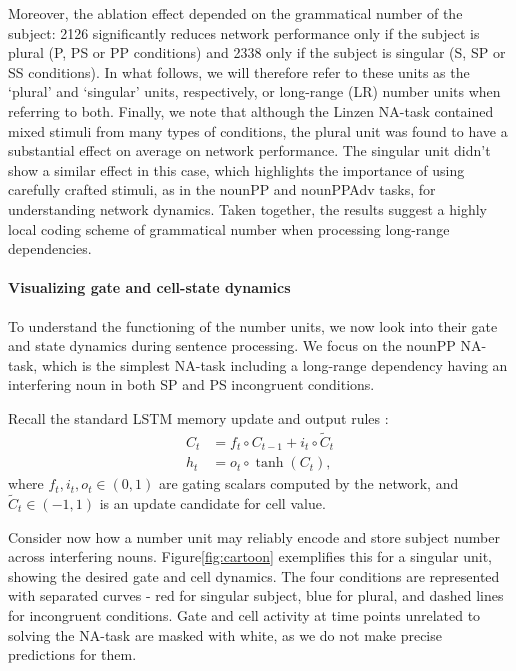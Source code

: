 Moreover, the ablation effect depended on the grammatical number of the subject: \unit{2}{126} significantly reduces
network performance only if the subject is plural (P, PS or PP conditions) and \unit{2}{338}
only if the subject is singular (S, SP or SS conditions). In what follows, we will therefore
refer to these units as the `plural' and `singular' units, respectively,
or long-range (LR) number units when referring to both. Finally, we note that although the Linzen NA-task contained mixed stimuli from many types of conditions, the plural unit was found to have a substantial effect on average on network performance. The singular unit didn't show a similar effect in this case, which highlights the importance of using carefully crafted stimuli, as in the nounPP and nounPPAdv tasks, for understanding network dynamics. Taken
together, the results suggest a highly local coding scheme of
grammatical number when processing long-range dependencies.

\paragraph{Visualizing gate and cell-state dynamics}\label{subsec:gate-dynamics}
To understand the functioning of the number units, we now look
into their gate and state dynamics during sentence processing. We
focus on the nounPP NA-task, which is the simplest NA-task including a
long-range dependency having an interfering noun in both SP and PS
incongruent conditions.

Recall the standard LSTM memory update and output rules \cite{Hochreiter:Schmidhuber:1997}:
\begin{align} 
    C_t &= f_t\circ C_{t-1} + i_t\circ \widetilde{C}_t \label{eq:update-rule} \\
     h_t &= o_t\circ \tanh(C_t) \label{eq:output},
\end{align}
where $f_t, i_t, o_t \in (0,1)$ are gating scalars computed by the network, and $\widetilde{C}_t \in (-1, 1)$ is an update candidate for cell value.

Consider now how a number unit may reliably encode and store subject
number across interfering nouns.  Figure\ref{fig:cartoon} exemplifies
this for a singular unit, showing the desired gate and cell
dynamics. The four conditions are represented with separated curves -
red for singular subject, blue for plural, and dashed lines for
incongruent conditions. Gate and cell activity at time points
unrelated to solving the NA-task are masked with white, as we do not
make precise predictions for them.

